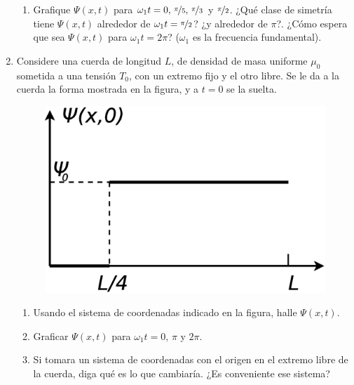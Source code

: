\documentclass[11pt,spanish]{article}
\begin{document}
\begin{enumerate}
\begin{enumerate}
        \item Grafique $\Psi(x,t)$ para $\omega_{1}t=0,\,\nicefrac{\pi}{5},\,\nicefrac{\pi}{3}$
        y $\nicefrac{\pi}{2}$. ¿Qué clase de simetría tiene $\Psi(x,t)$ 
        alrededor de $\omega_{1}t=\nicefrac{\pi}{2}$? ¿y alrededor de $\pi$?.
        ¿Cómo espera que sea $\Psi(x,t)$ para $\omega_{1}t=2\pi$? ($\omega_{1}$
        es la frecuencia fundamental).
    \end{enumerate}


    \item Considere una cuerda de longitud $L$, de densidad de masa uniforme
    $\mu_{0}$ sometida a una tensión $T_{0}$, con un extremo fijo y el otro
    libre. Se le da a la cuerda la forma mostrada en la figura, y a $t=0$ se la
    suelta.

    \begin{figure}[H]
        \centering{}\includegraphics[clip,scale=0.25]{figs/ej1-25}
    \end{figure}

    \begin{enumerate}
        \item Usando el sistema de coordenadas indicado en la figura, halle
        $\Psi(x,t)$.

        \item Graficar $\Psi(x,t)$ para $\omega_{1}t=0,\,\pi$ y $2\pi$.

        \item Si tomara un sistema de coordenadas con el origen en el extremo
        libre de la cuerda, diga qué es lo que cambiaría. ¿Es conveniente ese
        sistema?
    \end{enumerate}


\end{enumerate}
\end{document}
